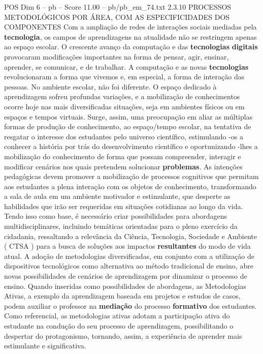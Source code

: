 \begin{textsample}{POS Dim 6 – pb – Score 11.00 – pb/pb\_em\_74.txt}  \label{ex:f6_pos_202}
2.3.10 PROCESSOS METODOLÓGICOS POR ÁREA, COM AS ESPECIFICIDADES DOS COMPONENTES Com a ampliação de redes de interações sociais mediadas pela \textbf{tecnologia}, os campos de aprendizagens na atualidade não se restringem apenas ao espaço escolar.
O crescente avanço da computação e das \textbf{tecnologias} \textbf{digitais} provocaram modificações importantes na forma de pensar, agir, ensinar, aprender, se comunicar, e de trabalhar.
A computação e as novas \textbf{tecnologias} revolucionaram a forma que vivemos e, em especial, a forma de interação das pessoas.
No ambiente escolar, não foi diferente.
O espaço dedicado à aprendizagem sofreu profundas variações, e a mobilização de conhecimentos ocorre hoje nas mais diversificadas situações, seja em ambientes físicos ou em espaços e tempos virtuais.
Surge, assim, uma preocupação em aliar as múltiplas formas de produção de conhecimento, ao espaço/tempo escolar, na tentativa de resgatar o interesse dos estudantes pelo universo científico, estimulando -os a conhecer a história por trás do desenvolvimento científico e oportunizando -lhes a mobilização do conhecimento de forma que possam compreender, interagir e modificar cenários nos quais pretendem solucionar \textbf{problemas}.
As intenções pedagógicas devem promover a mobilização de processos cognitivos que permitam aos estudantes a plena interação com os objetos de conhecimento, transformando a sala de aula em um ambiente motivador e estimulante, que desperte as habilidades que irão ser requeridas em situações cotidianas ao longo da vida.
Tendo isso como base, é necessário criar possibilidades para abordagens multidisciplinares, incluindo temáticas orientadas para o pleno exercício da cidadania, ressaltando a relevância da Ciência, Tecnologia, Sociedade e Ambiente ( CTSA ) para a busca de soluções aos impactos \textbf{resultantes} do modo de vida atual.
A adoção de metodologias diversificadas, em conjunto com a utilização de dispositivos tecnológicos como alternativa ao método tradicional de ensino, abre novas possibilidades de cenários de aprendizagem por dinamizar o processo de ensino.
Quando inseridas como possibilidades de abordagens, as Metodologias Ativas, a exemplo da aprendizagem baseada em projetos e estudos de casos, podem auxiliar o professor na \textbf{mediação} do processo \textbf{formativo} dos estudantes.
Como referencial, as metodologias ativas adotam a participação ativa do estudante na condução do seu processo de aprendizagem, possibilitando o despertar do protagonismo, tornando, assim, a experiência de aprender mais estimulante e significativa.

\end{textsample}
